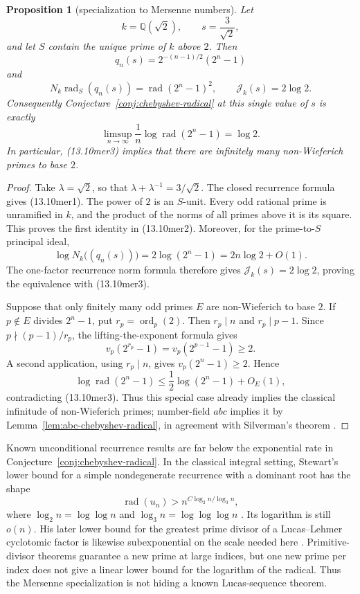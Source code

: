 \documentclass[11pt,reqno]{amsart}
\newtheorem{proposition}[theorem]{Proposition}
\theoremstyle{definition}
\theoremstyle{remark}
\newcommand{\Q}{\mathbb Q}
\begin{document}
\begin{proposition}[specialization to Mersenne numbers]
\label{prop:mersenne-radical-boundary}
Let
\[
 k=\Q(\sqrt2),\qquad s=\frac3{\sqrt2},
\]
and let \(S\) contain the unique prime of \(k\) above \(2\).  Then
\[
 q_n(s)=2^{-(n-1)/2}(2^n-1)
\tag{13.10mer1}
\]
and
\[
 N_k\operatorname{rad}_S(q_n(s))
 =\operatorname{rad}(2^n-1)^2,
 \qquad
 \mathcal J_k(s)=2\log2.
\tag{13.10mer2}
\]
Consequently Conjecture~\ref{conj:chebyshev-radical} at this single value
of \(s\) is exactly
\[
 \limsup_{n\to\infty}\frac1n
 \log\operatorname{rad}(2^n-1)=\log2.
\tag{13.10mer3}
\]
In particular, (13.10mer3) implies that there are infinitely many
non-Wieferich primes to base \(2\).
\end{proposition}

\begin{proof}
Take \(\lambda=\sqrt2\), so that
\(\lambda+\lambda^{-1}=3/\sqrt2\).  The closed recurrence formula gives
(13.10mer1).  The power of \(2\) is an \(S\)-unit.  Every odd rational
prime is unramified in \(k\), and the product of the norms of all primes
above it is its square.  This proves the first identity in (13.10mer2).
Moreover, for the prime-to-\(S\) principal ideal,
\[
 \log N_k\bigl((q_n(s))\bigr)
 =2\log(2^n-1)=2n\log2+O(1).
\]
The one-factor recurrence norm formula therefore gives
\(\mathcal J_k(s)=2\log2\), proving the equivalence with (13.10mer3).

Suppose that only finitely many odd primes \(E\) are non-Wieferich to base
\(2\).  If \(p\notin E\) divides \(2^n-1\), put
\(r_p=\operatorname{ord}_p(2)\).  Then \(r_p\mid n\) and
\(r_p\mid p-1\).  Since \(p\nmid(p-1)/r_p\), the
lifting-the-exponent formula gives
\[
 v_p(2^{r_p}-1)=v_p(2^{p-1}-1)\ge2.
\]
A second application, using \(r_p\mid n\), gives
\(v_p(2^n-1)\ge2\).  Hence
\[
 \log\operatorname{rad}(2^n-1)
 \le\frac12\log(2^n-1)+O_E(1),
\]
contradicting (13.10mer3).  Thus this special case already implies the
classical infinitude of non-Wieferich primes; number-field \(abc\)
implies it by Lemma~\ref{lem:abc-chebyshev-radical}, in agreement with
Silverman's theorem \cite{SilvermanWieferich}.
\end{proof}

Known unconditional recurrence results are far below the exponential rate
in Conjecture~\ref{conj:chebyshev-radical}.  In the classical integral
setting, Stewart's lower bound for a simple nondegenerate recurrence with a
dominant root has the shape
\[
 \operatorname{rad}(u_n)>
 n^{C\log_2 n/\log_3 n},
\]
where \(\log_2 n=\log\log n\) and
\(\log_3 n=\log\log\log n\) \cite{StewartSquarefree}.  Its logarithm is
still \(o(n)\).  His later lower bound for the greatest prime divisor of a
Lucas--Lehmer cyclotomic factor is likewise subexponential on the scale
needed here \cite{StewartLucasDivisors}.  Primitive-divisor theorems guarantee
a new prime at large indices, but one new prime per index does not give a
linear lower bound for the logarithm of the radical.  Thus the Mersenne
specialization is not hiding a known Lucas-sequence theorem.
\end{document}
